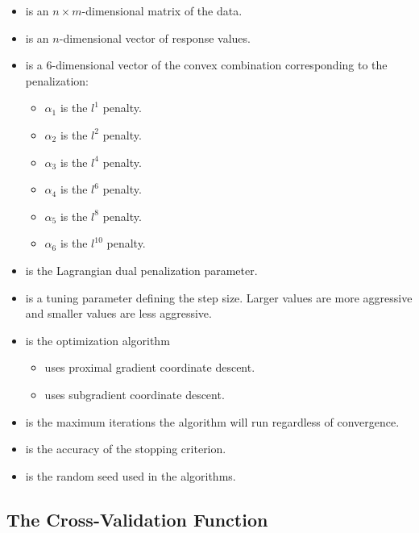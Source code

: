 \documentclass[article]{jss}
\numberwithin{equation}{section}
\begin{document}
\begin{itemize}
\item {} is an $n \times m$-dimensional matrix of the data.

\item {} is an $n$-dimensional vector of response values.

\item {} is a $6$-dimensional vector of the convex combination corresponding to the penalization:
 \begin{itemize}
   \item $\alpha_1$ is the $l^1$ penalty.
   \item $\alpha_2$ is the $l^2$ penalty.
   \item $\alpha_3$ is the $l^4$ penalty.
   \item $\alpha_4$ is the $l^6$ penalty.
   \item $\alpha_5$ is the $l^8$ penalty.
   \item $\alpha_6$ is the $l^{10}$ penalty.
\end{itemize}

\item {} is the Lagrangian dual penalization parameter.

\item {} is a tuning parameter defining the step size. Larger values are more aggressive and smaller values are less aggressive.

\item {} is the optimization algorithm
\begin{itemize}
\item {} uses proximal gradient coordinate descent.
\item {} uses subgradient coordinate descent.
\end{itemize}

\item {} is the maximum iterations the algorithm will run regardless of convergence.

\item {} is the accuracy of the stopping criterion.

\item {} is the random seed used in the algorithms.

\end{itemize}

\subsection{The Cross-Validation Function}
\end{document}
